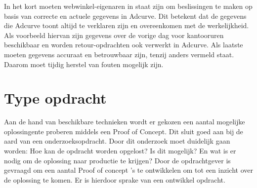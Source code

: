 In het kort moeten webwinkel-eigenaren in staat zijn om beslissingen te maken op basis van correcte en actuele gegevens in Adcurve. Dit betekent dat de gegevens die Adcurve toont altijd te verklaren zijn en overeenkomen met de werkelijkheid. Als voorbeeld hiervan zijn gegevens over de vorige dag voor kantooruren beschikbaar en worden retour-opdrachten ook verwerkt in Adcurve. Als laatste moeten gegevens accuraat en betrouwbaar zijn, tenzij anders vermeld staat. Daarom moet tijdig herstel van fouten mogelijk zijn.

\section{Type opdracht}

Aan de hand van beschikbare technieken wordt er gekozen een aantal mogelijke oplossingen\newline te proberen middels een Proof of Concept. Dit sluit goed aan bij de aard van een onderzoeksopdracht. Door dit onderzoek moet duidelijk gaan worden: Hoe kan de opdracht worden opgelost? Is dit mogelijk? En wat is er nodig om de oplossing naar productie te krijgen? Door de opdrachtgever is gevraagd om een aantal Proof of concept
's te ontwikkelen om tot een inzicht over de oplossing te komen. Er is hierdoor sprake van een ontwikkel opdracht.


